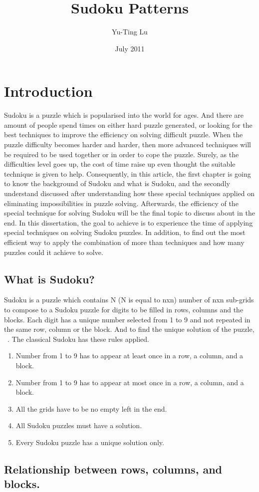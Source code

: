 \documentclass[11pt]{report}
\begin{document}
\title{Sudoku Patterns}
\author{Yu-Ting Lu}
\date{July 2011}
\maketitle

\tableofcontents

\chapter{Introduction}
\label{cha:Introduction}


Sudoku is a puzzle which is popularised into the world for ages. And there are amount of people spend times on either hard puzzle generated, or looking for the best techniques to improve the efficiency on solving difficult puzzle.
When the puzzle difficulty becomes harder and harder, then more advanced techniques will be required to be used together or in order to cope the puzzle. Surely, as the difficulties level goes up, the cost of time raise up even thought the suitable technique is given to help. Consequently, in this article, the first chapter is going to know the background of Sudoku and what is Sudoku, and the secondly understand discussed after understanding how these special techniques applied on eliminating impossibilities in puzzle solving. Afterwards, the efficiency of the special technique for solving Sudoku will be the final topic to discuss about in the end.
In this dissertation, the goal to achieve is to experience the time of applying special techniques on solving Sudoku puzzles. In addition, to find out the most efficient way to apply the combination of more than techniques and how many puzzles could it achieve to solve.


\section{What is Sudoku?}
\label{sec:whatissudoku}

Sudoku is a puzzle which contains N (N is equal to nxn) number of nxn sub-grids to compose to a Sudoku puzzle for digits to be filled in rows, columns and the blocks. Each digit has a unique number selected from 1 to 9 and not repeated in the same row, column or the block.
And to find the unique solution of the puzzle,  ~\cite{Berthier2007Sudoku}.
The classical Sudoku has these rules applied.
\begin{enumerate}
\item Number from 1 to 9 has to appear at least once in a row, a column, and a block.
\item Number from 1 to 9 has to appear at most once in a row, a column, and a block.
\item All the grids have to be no empty left in the end.
\item All Sudoku puzzles must have a solution.
\item Every Sudoku puzzle has a unique solution only.
\end{enumerate}


\section{Relationship between rows, columns, and blocks.}
\label{sec:Relationship}








\end{document}
